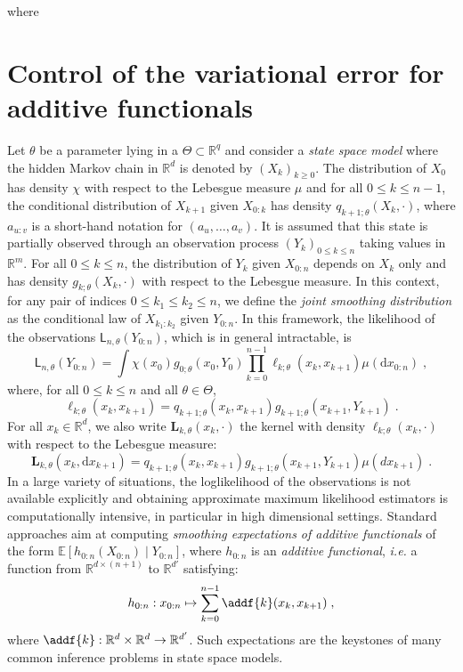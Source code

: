 \documentclass{article}
\newcommand{\1}{\mathbbm{1}}
\newcommand{\uk}[1]{\mathbf{L}_{#1}}
\newcommand{\md}[1]{g_{#1}}
\newcommand{\llh}[1]{\mathsf{L}_{#1}}
\newcommand{\parvec}{\theta}
\newcommand{\parspace}{\Theta}
\newcommand{\af}[1]{h_{#1}}
\newcommand{\hd}[1]{q_{#1}}
\def\pE{\mathbb{E}}
\newcommand{\rset}{\ensuremath{\mathbb{R}}}
\newcommand{\rmd}{\ensuremath{\mathrm{d}}}
\newcommand{\eqsp}{\;}
\newcommand{\qg}[1]{\ell_{#1}}
\begin{document}
where 

\clearpage
\newpage

\section{Control of the variational error for additive functionals}
Let $\parvec$ be a parameter lying in a $\Theta\subset \rset^q$ and consider a  \textit{state space model} where the hidden Markov chain  in $\rset^d$ is denoted by $(X_k)_{k\geqslant 0}$. The distribution of $X_0$ has density $\chi$ with respect to the Lebesgue measure $\mu$ and for all $0\leqslant k \leqslant n-1$, the conditional distribution of $X_{k+1} $ given $X_{0:k}$ has density $\hd{k+1;\parvec}(X_{k},\cdot)$, where $a_{u:v}$ is a short-hand notation for $(a_u,\ldots,a_v)$. 
It is assumed that this state  is partially observed  through an observation process $(Y_k)_{0\leqslant k \leqslant n}$ taking values in $\rset^m$. 
For all $0\leqslant k \leqslant n$, the distribution of $Y_k$ given $X_{0:n}$ depends on $X_k$ only and has density $\md{k;\parvec}(X_k,\cdot)$ with respect to the Lebesgue measure. 
In this context, for any pair of indices $0\leqslant k_1 \leqslant k_2 \leqslant n$, we define the \textit{joint smoothing distribution} as the conditional law of $X_{k_1:k_2}$ given $Y_{0:n}$. 
In this framework, the likelihood of the observations $\llh{n,\parvec}(Y_{0:n})$, which is  in general intractable, is
$$
\llh{n,\parvec}(Y_{0:n})  = \int \chi(x_0)\md{0;\parvec}(x_{0},Y_{0})\prod_{k=0}^{n-1}\qg{k;\parvec}(x_{k},x_{k+1})\mu(\rmd x_{0:n})\eqsp,
$$
 where, for all $0\leqslant k \leqslant n$ and all $\parvec\in\parspace$,
\begin{equation}
\label{eq:def:elln}
\qg{k;\parvec}(x_{k},x_{k+1}) = \hd{k+1;\parvec}(x_{k}, x_{k+1})\md{k+1;\parvec}(x_{k+1},Y_{k+1})\eqsp.
\end{equation}
For all $x_k\in\mathbb{R}^d$, we also write $\uk{k,\theta}(x_k, \cdot)$ the kernel with density $\qg{k;\parvec}(x_{k},\cdot) $ with respect to the Lebesgue measure:
$$
\uk{k,\theta}(x_k, \rmd x_{k+ 1})  = \hd{k+1;\parvec}(x_{k}, x_{k+1})\md{k+1;\parvec}(x_{k+1},Y_{k+1})\mu(dx_{k+1})\eqsp.
$$
In a large variety of situations, the loglikelihood of the observations is not available explicitly and obtaining approximate maximum likelihood estimators is computationally intensive, in particular in high dimensional settings. Standard approaches  aim at computing \textit{smoothing expectations of additive functionals} of the form $\pE \left[\af{0:n}(X_{0:n})\middle | Y_{0:n}\right]$,  where $\af{0:n}$ is an \textit{additive functional}, \textit{i.e.} a function from $\rset^{d \times (n + 1)}$ to $\rset^{d'}$ satisfying:
\begin{equation}
\label{eq:additive:functional}
\af{0:n}: x_{0:n} \mapsto \sum_{k=0}^{n-1}\addf{k}(x_{k},x_{k+1})\eqsp,
\end{equation}
where $\addf{k}:\rset^{d} \times \rset^{d}\to\rset^{d'}$.
Such expectations are the keystones of many common inference problems in state space models.
\end{document}
